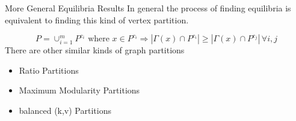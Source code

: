 \documentclass{beamer}
\begin{document}
\begin{frame}{More General Equilibria Results}
	In general the process of finding equilibria is equivalent to finding this kind of vertex partition.
	
	\begin{equation}
		P=\cup_{i=1}^m P^{c_i}\text{ where } x\in P^{c_i}\Rightarrow |\Gamma(x)\cap P^{c_i}|\geq |\Gamma(x)\cap P^{c_j}|\, \forall i,j 
	\end{equation}
	There are other similar kinds of graph partitions
	\begin{itemize}
		\item Ratio Partitions
		\item Maximum Modularity Partitions
		\item balanced (k,v) Partitions
	\end{itemize}
\end{frame}
\end{document}
